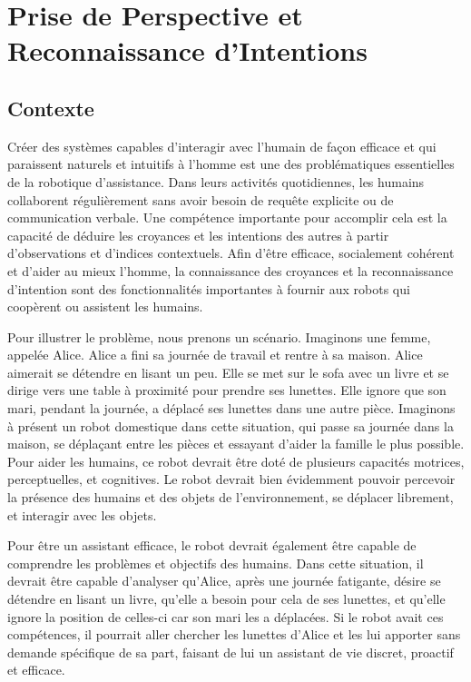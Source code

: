 \documentclass[a4paper,11pt,twoside]{StyleThese}
\begin{document}
\setcounter{chapter}{3} %
\dominitoc
\faketableofcontents
\fi

\chapter{Prise de Perspective et Reconnaissance d'Intentions}
\label{chapter4}
\minitoc

\section{Contexte}
Créer des systèmes capables d'interagir avec l'humain de façon efficace et qui paraissent naturels et intuitifs à l'homme est une des problématiques essentielles de la robotique d'assistance. Dans leurs activités quotidiennes, les humains collaborent régulièrement sans avoir besoin de requête explicite ou de communication verbale. Une compétence importante pour accomplir cela est la capacité de déduire les croyances et les intentions des autres à partir d'observations et d'indices contextuels. Afin d'être efficace, socialement cohérent et d'aider au mieux l'homme, la connaissance des croyances et la reconnaissance d'intention sont des fonctionnalités importantes à fournir aux robots qui coopèrent ou assistent les humains.

Pour illustrer le problème, nous prenons un scénario. Imaginons une femme, appelée Alice. Alice a fini sa journée de travail et rentre à sa maison. Alice aimerait se détendre en lisant un peu. Elle se met sur le sofa avec un livre et se dirige vers une table à proximité pour prendre ses lunettes. Elle ignore que son mari, pendant la journée, a déplacé ses lunettes dans une autre pièce.
Imaginons à présent un robot domestique dans cette situation, qui passe sa journée dans la maison, se déplaçant entre les pièces et essayant d'aider la famille le plus possible. Pour aider les humains, ce robot devrait être doté de plusieurs capacités motrices, perceptuelles, et cognitives. Le robot devrait bien évidemment pouvoir percevoir la présence des humains et des objets de l'environnement, se déplacer librement, et interagir avec les objets.

Pour être un assistant efficace, le robot devrait également être capable de comprendre les problèmes et objectifs des humains. Dans cette situation, il devrait être capable d'analyser qu'Alice, après une journée fatigante, désire se détendre en lisant un livre, qu'elle a besoin pour cela de ses lunettes, et qu'elle ignore la position de celles-ci car son mari les a déplacées. Si le robot avait ces compétences, il pourrait aller chercher les lunettes d'Alice et les lui apporter sans demande spécifique de sa part, faisant de lui un assistant de vie discret, proactif et efficace.
\end{document}
